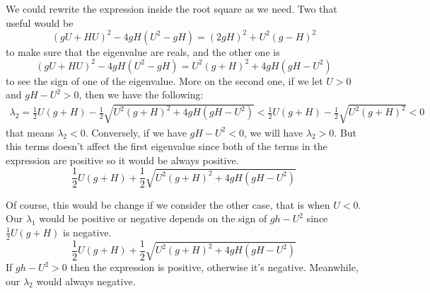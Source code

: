 \documentclass{article}
\newcommand{\half}{\frac{1}{2}}
\theoremstyle{definition}
\begin{document}

    We could rewrite the expression inside the root square as we need. 
    Two that useful would be 
    $$ (gU+HU)^2 - 4gH(U^2 - gH) = (2gH)^2 + U^2(g-H)^2 $$
    to make sure that the eigenvalue are reals, and the other one is 
    $$ (gU+HU)^2 - 4gH(U^2 - gH) = U^2(g+H)^2 + 4gH(gH - U^2)$$
    to see the sign of one of the eigenvalue. More on the second one, if we let $U>0$ and  
    $gH - U^2 > 0$, then we have the following: 
    \begin{align}
        \lambda_2 = \half U(g+H) - \half \sqrt{U^2(g+H)^2 + 4gH(gH - U^2)} %
        < \half U(g+H) - \half \sqrt{U^2(g+H)^2} < 0 
    \end{align}
    that means $\lambda_2 <0$. 
    Conversely, if we have $gH - U^2 < 0$, we will have $\lambda_2 >0$. 
    But this terms doesn't affect the first eigenvalue since both of
    the terms in the expression are positive so it would be always positive. 
    \[
        \half U(g+H) + \half \sqrt{U^2(g+H)^2 + 4gH(gH - U^2)}
    \]

    Of course, this would be change if we consider the other case, that is when $U<0$. 
    Our $\lambda_1$ would be positive or negative depends on the sign of $gh-U^2$ since
    $\half U(g+H)$ is negative. 
    \[
        \half U(g+H) + \half \sqrt{U^2(g+H)^2 + 4gH(gH - U^2)}
    \]
    If $gh-U^2 > 0$ then the expression is positive, otherwise it's negative. 
    Meanwhile, our $\lambda_2$ would always negative. 
\end{document}
